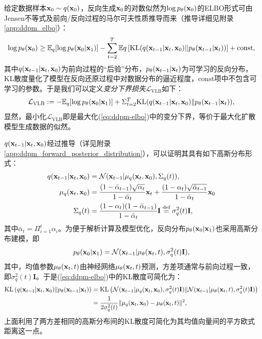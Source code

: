 \documentclass[11pt,a4paper,UTF8]{ctexart}
\begin{document}
给定数据样本$\mathbf{x}_0\sim q(\mathbf{x}_0)$，反向生成$\mathbf{x}_0$的对数似然为$\log p_{\theta}(\mathbf{x}_0)$的ELBO形式可由Jensen不等式及前向/反向过程的马尔可夫性质推导而来（推导详细见附录\ref{app:ddpm_elbo}）：
\begin{equation}
\log p_{\theta}(\mathbf{x}_0) \geq \mathbb{E}_q[\log p_{\theta}(\mathbf{x}_0|\mathbf{x}_1)]  - \sum_{t=2}^{T} \mathbb{E}q \left[ \mathrm{KL} (q(\mathbf{x}_{t-1}|\mathbf{x}_t,\mathbf{x}_0)||p_\theta(\mathbf{x}_{t-1}|\mathbf{x}_t)) \right] + \text{const},
\label{eq:ddpm-elbo}
\end{equation}
其中$q(\mathbf{x}_{t-1}|\mathbf{x}_t,\mathbf{x}_0)$为前向过程的“后验”分布，$p_\theta(\mathbf{x}_{t-1}|\mathbf{x}_t)$为可学习的反向分布，KL散度量化了模型在反向还原过程中对数据分布的逼近程度，$\text{const}$项中不包含可学习的参数。于是我们可以定义\emph{变分下界损失}$\mathcal{L}_{\text{VLB}}$如下：
\begin{equation}
\mathcal{L}_{\text{VLB}} := -\mathbb{E}_q [\log p_{\theta}(\mathbf{x}_0|\mathbf{x}_1)] +  \Sigma_{t=2}^T \text{KL}(q(\mathbf{x}_{t-1}|\mathbf{x}_t,\mathbf{x}_0) \| p_{\theta}(\mathbf{x}_{t-1}|\mathbf{x}_t)),
\label{ddpm:loss_vlb}
\end{equation}
显然，最小化$\mathcal{L}_{\text{VLB}}$即是最大化(\ref{eq:ddpm-elbo})中的变分下界，等价于最大化扩散模型生成数据的似然。

$q(\mathbf{x}_{t-1}|\mathbf{x}_t,\mathbf{x}_0)$经过推导（详见附录\ref{app:ddpm_forward_posterior_distribution}），可以证明其具有如下高斯分布形式：
\begin{align}
\begin{split}
    q(\mathbf{x}_{t-1}|\mathbf{x}_t,\mathbf{x}_0) &= \mathcal{N}(\mathbf{x}_{t-1}|\mu_q(\mathbf{x}_t,\mathbf{x}_0),\Sigma_q(t)),\\
    \mu_q(\mathbf{x}_t,\mathbf{x}_0) &= \frac{(1-\bar{\alpha}_{t-1})\sqrt{\alpha_t}}{1-\bar{\alpha}_t}\mathbf{x}_t + \frac{(1-\alpha_t)\sqrt{\bar{\alpha}_{t-1}}}{1-\bar{\alpha}_t}\mathbf{x}_0 \\
    \Sigma_q(t) &= \frac{(1-\alpha_t)(1-\bar{\alpha}_{t-1})}{1-\bar{\alpha}_t}\mathbf{I}  \stackrel{\text{def}}{=} \sigma_q^2(t)\mathbf{I},
\end{split}
\label{eq:reverse-posterior-main}
\end{align}
其中$\bar{\alpha}_t=\Pi_{i=1}^t \alpha_i$。为便于解析计算及模型优化，反向分布$p_{\theta}(\mathbf{x}_0|\mathbf{x}_1)$也采用高斯分布建模，即
\begin{equation*}
    p_{\theta}(\mathbf{x}_0|\mathbf{x}_1)=\mathcal{N}(\mathbf{x}_{t-1}| \mu_{\theta}(\mathbf{x}_t,t), \sigma_q^2(t)\mathbf{I}),
\end{equation*}
其中，均值参数$\mu_\theta(\mathbf{x}_t,t)$由神经网络$\mu_{\theta}(\mathbf{x}_t,t)$预测，方差项通常与前向过程一致，即$\sigma_q^2(t)\mathbf{I}$。于是(\ref{eq:ddpm-elbo})中的KL散度可简化为：
\begin{align}
\begin{split}
    \text{KL}\left(q(\mathbf{x}_{t-1}|\mathbf{x}_t,\mathbf{x}_0) \| p_{\theta}(\mathbf{x}_{t-1}|\mathbf{x}_t)\right) &= \text{KL} \left(\mathcal{N}(\mathbf{x}_{t-1}|\mu_q(\mathbf{x}_t,\mathbf{x}_0),\sigma_q^2(t)\mathbf{I}) \| \mathcal{N}(\mathbf{x}_{t-1}| \mu_{\theta}(\mathbf{x}_t,t), \sigma_q^2(t)\mathbf{I})\right) \\
    &= \frac{1}{2\sigma_q^2(t)} \| \mu_q(\mathbf{x}_t,\mathbf{x}_0) - \mu_{\theta}(\mathbf{x}_t,t) \|^2,
\label{ddpm:elbo_simp_1}
\end{split}
\end{align}
上面利用了两方差相同的高斯分布间的KL散度可简化为其均值向量间的平方欧式距离这一点。
\end{document}
